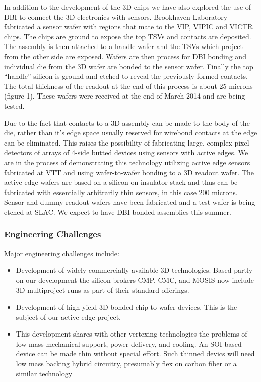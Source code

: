 In addition to the development of the 3D chips we have also explored the use of DBI to connect the 3D electronics with sensors.  Brookhaven Laboratory fabricated a sensor wafer with regions that mate to the VIP, VIPIC and VICTR chips.  The chips are ground to expose the top TSVs and contacts are deposited. The assembly is then attached to a handle wafer and the TSVs which project from the other side are exposed.  Wafers are then process for DBI bonding and individual die from the 3D wafer are bonded to the sensor wafer.  Finally the top “handle” silicon is ground and etched to reveal the previously formed contacts.  The total thickness of the readout at the end of this process is about 25 microns (figure 1). These wafers were received at the end of March 2014 and are being tested.

Due to the fact that contacts to a 3D assembly can be made to the body of the die, rather than it’s edge space usually reserved for wirebond contacts at the edge can be eliminated.  This raises the possibility of fabricating large, complex pixel detectors of arrays of 4-side butted devices using sensors with active edges.  We are in the process of demonstrating this technology utilizing active edge sensors fabricated at VTT and using wafer-to-wafer bonding to a 3D readout wafer. The active edge wafers are based on a silicon-on-insulator stack and thus can be fabricated with essentially arbitrarily thin sensors, in this case 200 microns. Sensor and dummy readout wafers have been fabricated and a test wafer is being etched at SLAC.  We expect to have DBI bonded assemblies this summer.

\subsubsection{Engineering Challenges}
Major  engineering challenges include:
\begin{itemize}
\item Development of widely commercially available 3D technologies.  Based partly on our development the silicon brokers CMP, CMC, and MOSIS now include 3D multiproject runs as part of their standard offerings.
\item Development of high yield 3D bonded chip-to-wafer devices.  This is the subject of our active edge project.
\item This development shares with other vertexing technologies the problems of low mass mechanical support, power delivery, and cooling. An SOI-based device can be made thin without special effort.  Such thinned devics will need low mass backing hybrid circuitry, presumably flex on carbon fiber or a similar technology
\end{itemize}

